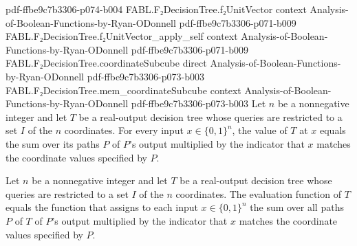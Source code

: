 \begin{theorem}
  {pdf-ffbe9c7b3306-p074-b004}
\proofstep
  {FABL.F₂DecisionTree.f₂UnitVector}
  {context}
  {Analysis-of-Boolean-Functions-by-Ryan-ODonnell}
  {pdf-ffbe9c7b3306-p071-b009}
\proofstep
  {FABL.F₂DecisionTree.f₂UnitVector_apply_self}
  {context}
  {Analysis-of-Boolean-Functions-by-Ryan-ODonnell}
  {pdf-ffbe9c7b3306-p071-b009}
\proofstep
  {FABL.F₂DecisionTree.coordinateSubcube}
  {direct}
  {Analysis-of-Boolean-Functions-by-Ryan-ODonnell}
  {pdf-ffbe9c7b3306-p073-b003}
\proofstep
  {FABL.F₂DecisionTree.mem_coordinateSubcube}
  {context}
  {Analysis-of-Boolean-Functions-by-Ryan-ODonnell}
  {pdf-ffbe9c7b3306-p073-b003}
Let $n$ be a nonnegative integer and let $T$ be a real-output decision tree whose
queries are restricted to a set $I$ of the $n$ coordinates. For every input
$x\in\{0,1\}^n$, the value of $T$ at $x$ equals the sum over its paths $P$ of $P$'s
output multiplied by the indicator that $x$ matches the coordinate values specified by
$P$.
\end{theorem}

\begin{theorem}
\leanok
{}
Let $n$ be a nonnegative integer and let $T$ be a real-output decision tree whose
queries are restricted to a set $I$ of the $n$ coordinates. The evaluation function of
$T$ equals the function that assigns to each input $x\in\{0,1\}^n$ the sum over all
paths $P$ of $T$ of $P$'s output multiplied by the indicator that $x$ matches the
coordinate values specified by $P$.
\end{theorem}

